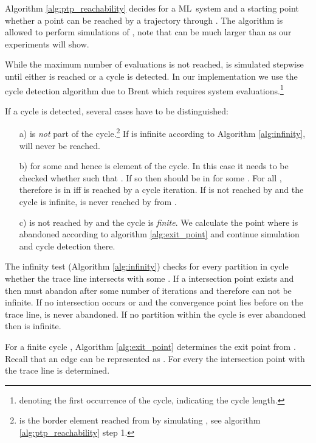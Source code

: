 \documentclass[copyright,creativecommons]{packages/eptcs}
\newcommand{\ml}{\mbox{ML}}
\begin{document}
Algorithm \ref{alg:ptp_reachability} decides for a \ml~system  and a starting point  whether a point  can be reached by a trajectory  through . The algorithm is allowed to perform  simulations of , note that  can be much larger than  as our experiments will show.

While the maximum number of evaluations is not reached,  is simulated stepwise until either  is reached or a cycle is detected. In our implementation we use the cycle detection algorithm due to Brent \cite{B80} which requires  system evaluations.\footnote{ denoting the first occurrence of the cycle,  indicating the cycle length.} 

If a cycle  is detected, several cases have to be distinguished: 

\begin{enumerate}

\item[a)]  is \emph{not} part of the cycle.\footnote{ is the border element reached from  by simulating , see algorithm \ref{alg:ptp_reachability} step 1.} If  is infinite according to Algorithm \ref{alg:infinity},  will never be reached. 

\item[b)]   for some  and hence is element of the cycle. In this case it needs to be checked whether  such that . If so then  should be in  for some . For all ,  therefore  is in  iff  is reached by a cycle iteration. If  is not reached by  and the cycle is infinite,  is never reached by  from .

\item[c)]   is not reached by  and the cycle is \emph{finite}. We calculate the point  where  is abandoned according to algorithm \ref{alg:exit_point} and continue simulation and cycle detection there.

\end{enumerate}


The infinity test (Algorithm \ref{alg:infinity}) checks for every partition  in cycle  whether the trace line  intersects with some . If a intersection point  exists and  then  must abandon  after some number of iterations and therefore can not be infinite. If no intersection occurs or  and the convergence point  lies before  on the trace line,  is never abandoned. If no partition within the cycle is ever abandoned then  is infinite.


For a finite cycle , Algorithm \ref{alg:exit_point} determines the exit point  from . Recall that an edge can be represented as . For every  the intersection point  with the trace line is determined. 
\end{document}
